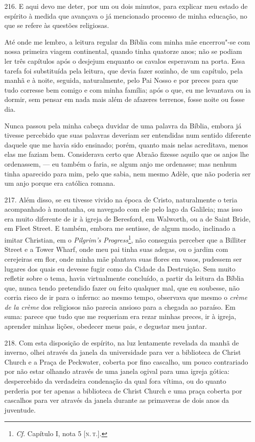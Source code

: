 216. E aqui devo me deter, por um ou dois minutos, para explicar meu
estado de espírito à medida que avançava o já mencionado processo de
minha educação, no que se refere às questões religiosas.

Até onde me lembro, a leitura regular da Bíblia com minha mãe
encerrou"-se com nossa primeira viagem continental, quando tinha quatorze
anos; não se podiam ler três capítulos após o desjejum enquanto os
cavalos esperavam na porta. Essa tarefa foi substituída pela leitura,
que devia fazer sozinho, de um capítulo, pela manhã e à noite, seguida,
naturalmente, pelo Pai Nosso e por preces para que tudo corresse bem
comigo e com minha família; após o que, eu me levantava ou ia dormir,
sem pensar em nada mais além de afazeres terrenos, fosse noite ou fosse
dia.

Nunca passou pela minha cabeça duvidar de uma palavra da Bíblia, embora
já tivesse percebido que suas palavras deveriam ser entendidas num
sentido diferente daquele que me havia sido ensinado; porém, quanto mais
nelas acreditava, menos elas me faziam bem. Considerava certo que Abraão
fizesse aquilo que os anjos lhe ordenassem, --- eu também o faria, se
algum anjo me ordenasse; mas nenhum tinha aparecido para mim, pelo que
sabia, nem mesmo Adèle, que não poderia ser um anjo porque era católica
romana.

217. Além disso, se eu tivesse vivido na época de Cristo, naturalmente o
teria acompanhado à montanha, ou navegado com ele pelo lago da Galileia;
mas isso era muito diferente de ir à igreja de Beresford, em Walworth,
ou a de Saint Bride, em Fleet Street. E também, embora me sentisse, de
algum modo, inclinado a imitar Christian, em o \emph{Pilgrim's
Progress}\footnote{\emph{Cf.} Capítulo I, nota 5 {[}\textsc{n.\,t.}{]}.}, não
conseguia perceber que a Billiter Street e a Tower Wharf, onde meu pai
tinha suas adegas, ou o jardim com cerejeiras em flor, onde minha mãe
plantava suas flores em vasos, pudessem ser lugares dos quais eu devesse
fugir como da Cidade da Destruição. Sem muito refletir sobre o tema,
havia virtualmente concluído, a partir da leitura da Bíblia que, nunca
tendo pretendido fazer ou feito qualquer mal, que eu soubesse, não
corria risco de ir para o inferno: ao mesmo tempo, observava que mesmo o
\emph{crème de la crème} dos religiosos não parecia ansioso para a
chegada ao paraíso. Em suma: parece que tudo que me requeriam era rezar
minhas preces, ir à igreja, aprender minhas lições, obedecer meus pais,
e degustar meu jantar.

218. Com esta disposição de espírito, na luz lentamente revelada da
manhã de inverno, olhei através da janela da universidade para ver a
biblioteca de Christ Church e a Praça de Peckwater, coberta por fino
cascalho, um pouco contrariado por não estar olhando através de uma
janela ogival para uma igreja gótica: despercebido da verdadeira
condenação da qual fora vítima, ou do quanto perderia por ter apenas a
biblioteca de Christ Church e uma praça coberta por cascalhos para ver
através da janela durante as primaveras de dois anos da juventude.


